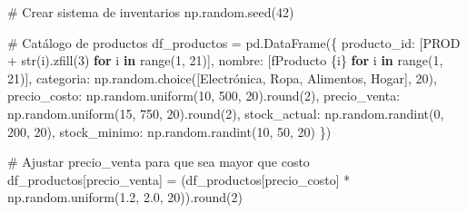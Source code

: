 \documentclass[
  doc,
  floatsintext,
  longtable,
  a4paper,
  nolmodern,
  notxfonts,
  notimes,
  12pt,
  colorlinks=true,linkcolor=blue,citecolor=blue,urlcolor=blue]{apa7}
\newenvironment{Shaded}{\begin{snugshade}}{\end{snugshade}}
\newcommand{\BuiltInTok}[1]{\textcolor[rgb]{0.00,0.23,0.31}{#1}}
\newcommand{\CommentTok}[1]{\textcolor[rgb]{0.37,0.37,0.37}{#1}}
\newcommand{\ControlFlowTok}[1]{\textcolor[rgb]{0.00,0.23,0.31}{\textbf{#1}}}
\newcommand{\DecValTok}[1]{\textcolor[rgb]{0.68,0.00,0.00}{#1}}
\newcommand{\FloatTok}[1]{\textcolor[rgb]{0.68,0.00,0.00}{#1}}
\newcommand{\KeywordTok}[1]{\textcolor[rgb]{0.00,0.23,0.31}{\textbf{#1}}}
\newcommand{\NormalTok}[1]{\textcolor[rgb]{0.00,0.23,0.31}{#1}}
\newcommand{\OperatorTok}[1]{\textcolor[rgb]{0.37,0.37,0.37}{#1}}
\newcommand{\SpecialCharTok}[1]{\textcolor[rgb]{0.37,0.37,0.37}{#1}}
\newcommand{\SpecialStringTok}[1]{\textcolor[rgb]{0.13,0.47,0.30}{#1}}
\newcommand{\StringTok}[1]{\textcolor[rgb]{0.13,0.47,0.30}{#1}}
\begin{document}
\begin{Shaded}
\begin{Highlighting}[]
\CommentTok{\# Crear sistema de inventarios}
\NormalTok{np.random.seed(}\DecValTok{42}\NormalTok{)}

\CommentTok{\# Catálogo de productos}
\NormalTok{df\_productos }\OperatorTok{=}\NormalTok{ pd.DataFrame(\{}
    \StringTok{\textquotesingle{}producto\_id\textquotesingle{}}\NormalTok{: [}\StringTok{\textquotesingle{}PROD\textquotesingle{}} \OperatorTok{+} \BuiltInTok{str}\NormalTok{(i).zfill(}\DecValTok{3}\NormalTok{) }\ControlFlowTok{for}\NormalTok{ i }\KeywordTok{in} \BuiltInTok{range}\NormalTok{(}\DecValTok{1}\NormalTok{, }\DecValTok{21}\NormalTok{)],}
    \StringTok{\textquotesingle{}nombre\textquotesingle{}}\NormalTok{: [}\SpecialStringTok{f\textquotesingle{}Producto }\SpecialCharTok{\{}\NormalTok{i}\SpecialCharTok{\}}\SpecialStringTok{\textquotesingle{}} \ControlFlowTok{for}\NormalTok{ i }\KeywordTok{in} \BuiltInTok{range}\NormalTok{(}\DecValTok{1}\NormalTok{, }\DecValTok{21}\NormalTok{)],}
    \StringTok{\textquotesingle{}categoria\textquotesingle{}}\NormalTok{: np.random.choice([}\StringTok{\textquotesingle{}Electrónica\textquotesingle{}}\NormalTok{, }\StringTok{\textquotesingle{}Ropa\textquotesingle{}}\NormalTok{, }\StringTok{\textquotesingle{}Alimentos\textquotesingle{}}\NormalTok{, }\StringTok{\textquotesingle{}Hogar\textquotesingle{}}\NormalTok{], }\DecValTok{20}\NormalTok{),}
    \StringTok{\textquotesingle{}precio\_costo\textquotesingle{}}\NormalTok{: np.random.uniform(}\DecValTok{10}\NormalTok{, }\DecValTok{500}\NormalTok{, }\DecValTok{20}\NormalTok{).}\BuiltInTok{round}\NormalTok{(}\DecValTok{2}\NormalTok{),}
    \StringTok{\textquotesingle{}precio\_venta\textquotesingle{}}\NormalTok{: np.random.uniform(}\DecValTok{15}\NormalTok{, }\DecValTok{750}\NormalTok{, }\DecValTok{20}\NormalTok{).}\BuiltInTok{round}\NormalTok{(}\DecValTok{2}\NormalTok{),}
    \StringTok{\textquotesingle{}stock\_actual\textquotesingle{}}\NormalTok{: np.random.randint(}\DecValTok{0}\NormalTok{, }\DecValTok{200}\NormalTok{, }\DecValTok{20}\NormalTok{),}
    \StringTok{\textquotesingle{}stock\_minimo\textquotesingle{}}\NormalTok{: np.random.randint(}\DecValTok{10}\NormalTok{, }\DecValTok{50}\NormalTok{, }\DecValTok{20}\NormalTok{)}
\NormalTok{\})}

\CommentTok{\# Ajustar precio\_venta para que sea mayor que costo}
\NormalTok{df\_productos[}\StringTok{\textquotesingle{}precio\_venta\textquotesingle{}}\NormalTok{] }\OperatorTok{=}\NormalTok{ (df\_productos[}\StringTok{\textquotesingle{}precio\_costo\textquotesingle{}}\NormalTok{] }\OperatorTok{*} 
\NormalTok{                                 np.random.uniform(}\FloatTok{1.2}\NormalTok{, }\FloatTok{2.0}\NormalTok{, }\DecValTok{20}\NormalTok{)).}\BuiltInTok{round}\NormalTok{(}\DecValTok{2}\NormalTok{)}


\end{Highlighting}
\end{Shaded}
\end{document}
